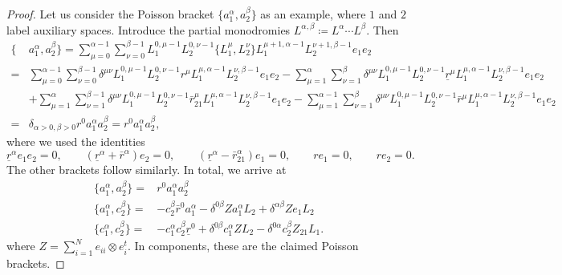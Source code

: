 \begin{proof}
    Let us consider the Poisson bracket $\{ a_1^\alpha,a_2^\beta \}$ as an example, where $1$ and $2$ label auxiliary spaces. Introduce the partial monodromies $L^{\alpha,\beta} \coloneq L^\alpha \cdots L^\beta$. Then
    \begin{equation*}
        \begin{aligned}
            \{ &a_1^\alpha,a_2^\beta \} = \sum_{\mu=0}^{\alpha-1} \sum_{\nu=0}^{\beta-1} L_1^{0,\mu-1} L_2^{0,\nu-1} \{ L_1^\mu, L_2^\nu \} L_1^{\mu+1,\alpha-1} L_2^{\nu+1,\beta-1} e_1 e_2 \\
            ={}& \sum_{\mu=0}^{\alpha-1} \sum_{\nu=0}^{\beta-1} \delta^{\mu\nu} L_1^{0,\mu-1} L_2^{0,\nu-1} r^\mu L_1^{\mu,\alpha-1} L_2^{\nu,\beta-1} e_1 e_2 - \sum_{\mu=1}^{\alpha} \sum_{\nu=1}^{\beta} \delta^{\mu\nu} L_1^{0,\mu-1} L_2^{0,\nu-1} \underline r^\mu L_1^{\mu,\alpha-1} L_2^{\nu,\beta-1} e_1 e_2 \\
            &+ \sum_{\mu=1}^{\alpha} \sum_{\nu=1}^{\beta-1} \delta^{\mu\nu} L_1^{0,\mu-1} L_2^{0,\nu-1} \bar r_{21}^\mu L_1^{\mu,\alpha-1} L_2^{\nu,\beta-1} e_1 e_2 - \sum_{\mu=1}^{\alpha-1} \sum_{\nu=1}^{\beta} \delta^{\mu\nu} L_1^{0,\mu-1} L_2^{0,\nu-1} \bar r^\mu L_1^{\mu,\alpha-1} L_2^{\nu,\beta-1} e_1 e_2 \\
            ={}& \delta_{\alpha>0,\beta>0} r^0 a_1^\alpha a_2^\beta = r^0 a_1^\alpha a_2^\beta,
        \end{aligned}
    \end{equation*}
    where we used the identities
    \begin{equation*}
        \underline r^\alpha e_1 e_2 = 0, \qquad (\underline r^\alpha + \bar r^\alpha) e_2 = 0, \qquad (\underline r^\alpha - \bar r_{21}^\alpha) e_1 = 0, \qquad r e_1 = 0, \qquad r e_2 = 0.
    \end{equation*}
    The other brackets follow similarly. In total, we arrive at
    \begin{align*}
        \{ a_1^\alpha,a_2^\beta \} ={}& r^0 a_1^\alpha a_2^\beta \\
        \{ a_1^\alpha,c_2^\beta \} ={}& {-c_2^\beta} \bar r^0 a_1^\alpha - \delta^{0\beta} Z a_1^\alpha L_2 + \delta^{\alpha\beta} Z e_1 L_2 \\
        \{ c_1^\alpha,c_2^\beta \} ={}& {-c_1^\alpha} c_2^\beta \underline r^0 + \delta^{0\beta} c_1^\alpha Z L_2 - \delta^{0\alpha} c_2^\beta Z_{21} L_1.
    \end{align*}
    where $Z = \sum_{i=1}^N e_{ii} \otimes e_i^t$. In components, these are the claimed Poisson brackets.
\end{proof}

